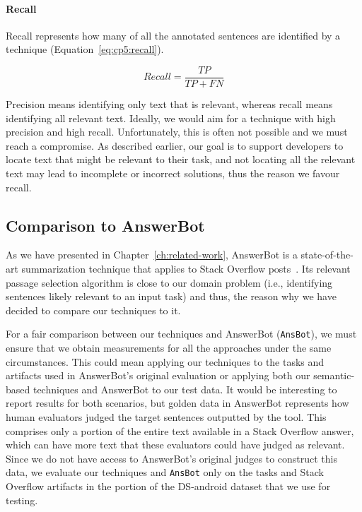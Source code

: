 \paragraph{\textbf{Recall}} Recall represents how many of all the annotated sentences are identified by a technique (Equation~\ref{eq:cp5:recall}).


\begin{equation}
\label{eq:cp5:recall}        
    Recall = \frac{TP}{TP + FN}
\end{equation}



\medskip
Precision means identifying only text that is relevant, whereas recall means identifying all relevant text.
Ideally, we would aim for a technique with high precision and high recall. Unfortunately, this is often not possible and we must reach a compromise.
As described earlier, our goal is to support developers to locate text that might be relevant to their task, 
and not locating all the relevant text may lead to incomplete or incorrect solutions, thus the reason we favour recall.






\subsection{Comparison to AnswerBot}
\label{cp5:comparison}


As we have presented in Chapter~\ref{ch:related-work}, AnswerBot is a state-of-the-art summarization technique that applies to Stack Overflow posts~\cite{Xu2017}. Its relevant passage selection algorithm is close to our domain problem (i.e., identifying sentences likely relevant to an input task)
and thus, the reason why we have decided to compare our techniques to it. 


For a fair comparison between our techniques and AnswerBot (\texttt{AnsBot}), we must ensure that we obtain measurements for all the approaches under the same circumstances. 
This could mean applying our techniques to the tasks and artifacts used in AnswerBot's original evaluation or applying both our semantic-based techniques and AnswerBot to our test data.
It would be interesting to report results for both scenarios, but golden data in AnswerBot represents how human evaluators judged the target sentences outputted by the tool.
This comprises only a portion of the entire text available in a Stack Overflow answer, which can have more text that these evaluators could have judged as relevant. 
Since we do not have access to AnswerBot's original judges to construct this data,
 we evaluate our techniques and \texttt{AnsBot} only on the tasks and Stack Overflow artifacts in the portion of the \acs{DS-android} dataset that we use for testing.


